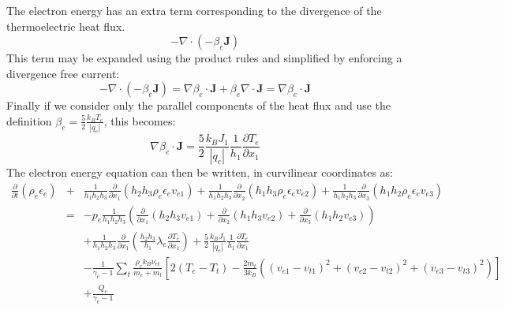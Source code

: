 \documentclass[11pt,letterpaper]{article}
\begin{document}
The electron energy has an extra term corresponding to the divergence of the thermoelectric heat flux.
\begin{equation}
- \nabla \cdot \left( - \beta_e \mathbf{J} \right)
\end{equation}
This term may be expanded using the product rules and simplified by enforcing a divergence free current:
\begin{equation}
- \nabla \cdot \left( - \beta_e \mathbf{J} \right) = \nabla \beta_e \cdot \mathbf{J} + \beta_e \nabla \cdot \mathbf{J} = \nabla \beta_e \cdot \mathbf{J}
\end{equation}
Finally if we consider only the parallel components of the heat flux and use the definition $\beta_e = \frac{5}{2} \frac{k_B T_e}{|q_e|}$, this becomes:
\begin{equation}
\nabla \beta_e \cdot \mathbf{J} = \frac{5}{2} \frac{k_B J_1}{|q_e|} \frac{1}{h_1} \frac{\partial T_e}{\partial x_1}
\end{equation}
The electron energy equation can then be written, in curvilinear coordinates as:
\begin{eqnarray}
\frac{\partial}{\partial t} \left( \rho_e \epsilon_e \right) &+& \frac{1}{h_1 h_2 h_3} \frac{\partial}{\partial x_1} \left( h_2 h_3 \rho_e \epsilon_e v_{e1} \right) + \frac{1}{h_1 h_2 h_3} \frac{\partial}{\partial x_2} \left( h_1 h_3 \rho_e \epsilon_e v_{e2} \right) + \frac{1}{h_1 h_2 h_3} \frac{\partial}{\partial x_3} \left( h_1 h_2 \rho_e \epsilon_e v_{e3} \right) \nonumber \\
&=& -p_e \frac{1}{h_1 h_2 h_3} \left( \frac{\partial}{\partial x_1} \left( h_2 h_3 v_{e1} \right) + \frac{\partial}{\partial x_2} \left( h_1 h_3 v_{e2} \right) + \frac{\partial}{\partial x_3} \left( h_1 h_2 v_{e3} \right) \right) \nonumber \\
&~& + \frac{1}{h_1 h_2 h_3} \frac{\partial}{\partial x_1} \left( \frac{h_2 h_3}{h_1} \lambda_e \frac{\partial T_e}{\partial x_1} \right) + \frac{5}{2} \frac{k_B J_1}{|q_e|} \frac{1}{h_1} \frac{\partial T_e}{\partial x_1} \nonumber \\
&~& - \frac{1}{\gamma_e - 1} \sum_t \frac{\rho_e k_B \nu_{et}}{m_e + m_t} \left[ 2 \left( T_e - T_t \right) - \frac{2 m_t}{3 k_B} \left( \left( v_{e1} - v_{t1} \right)^2 + \left( v_{e2} - v_{t2} \right)^2 + \left( v_{e3} - v_{t3} \right)^2 \right) \right] \nonumber \\
&~& + \frac{Q_e}{\gamma_e - 1} \label{eqn:electronenergycoord}
\end{eqnarray}
\end{document}
